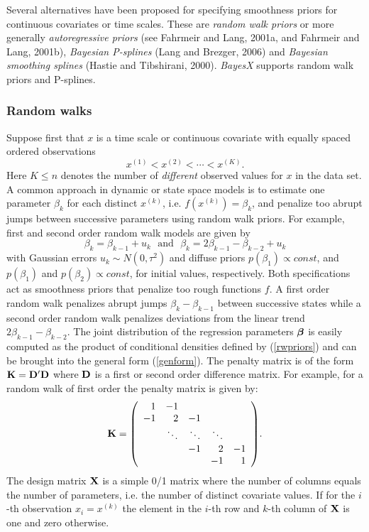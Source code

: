 \documentclass[11pt,a4paper,twoside]{bayesxarticle}
\begin{document}
Several alternatives have been  proposed for specifying smoothness
priors for continuous covariates or time scales. These are {\em
random walk priors} or more generally {\em autoregressive priors}
(see Fahrmeir and Lang, 2001a, and Fahrmeir and Lang, 2001b), {\em
Bayesian P-splines} (Lang and Brezger, 2006) and {\em Bayesian
smoothing splines} (Hastie and Tibshirani, 2000). {\em BayesX}
supports random walk priors and P-splines.

\subsubsection{Random walks}

Suppose first that $x$ is a time scale or continuous covariate
with equally spaced ordered observations
$$
x^{(1)} < x^{(2)} < \cdots < x^{(K)}.
$$
Here $K \leq n$ denotes the number of {\em different} observed
values for $x$ in the data set. A common approach in dynamic or
state space models is to estimate one parameter $\beta_{k}$ for
each distinct $x^{(k)}$, i.e. $f(x^{(k)}) = \beta_{k}$, and
penalize too abrupt jumps between successive parameters using random
walk priors. For example, first and second order random walk models
are given by
\begin{equation}
\label{rwpriors}
\beta_{k}=\beta_{k-1}+u_{k}\,\,\,\,\mbox{and}\,\,\,\,\beta_{k}=2\beta_{k-1}-\beta_{k-2}+u_{k}
\end{equation}
with Gaussian errors $u_{k}\sim N(0,\tau^{2})$ and diffuse priors
$p(\beta_{1})\propto const$, and $p(\beta_{1})$ and
$p(\beta_{2})\propto const$, for initial values, respectively. Both
specifications act as smoothness priors that penalize too rough
functions $f$. A first order random walk penalizes abrupt jumps
$\beta_{k}-\beta_{k-1}$ between successive states while a second
order random walk penalizes deviations from the linear trend $2
\beta_{k-1}-\beta_{k-2}$. The joint distribution of the
regression parameters $\boldsymbol{\beta}$ is easily computed as the product of
conditional densities defined by (\ref{rwpriors}) and can be brought
into the general form (\ref{genform}). The penalty matrix is of the
form $\mathbf{K}=\mathbf{D}'\mathbf{D}$ where $\mathbf{D}$ is a first or second order difference
matrix. For example, for a random walk of first order the penalty
matrix is given by:
$$
\Kvec = {\footnotesize \left(
\begin{array}{rrrrr}
 1 & -1 & & &  \\
-1 & 2 & -1 & & \\
 &  \ddots & \ddots & \ddots &  \\
 & & -1 & 2 & -1 \\
  & & & -1 & 1
\end{array}
\right) }.
$$
The design matrix $\mathbf{X}$ is a simple 0/1 matrix where the number of
columns equals the number of parameters, i.e. the number of distinct
covariate values. If for the $i$-th observation $x_{i}=x^{(k)}$
the element in the $i$-th row and $k$-th column of $\mathbf{X}$ is one and
zero otherwise.
\end{document}
